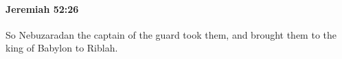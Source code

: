 
		\paragraph{Jeremiah 52:26} %
			\label{JEREMIAH-52-26}

			So Nebuzaradan the captain of the guard took them, and brought them to the king of Babylon to Riblah.


